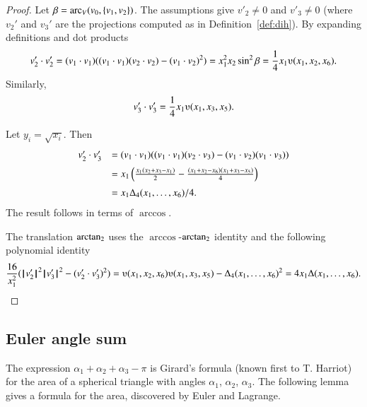 \begin{proof}
Let $\beta = \operatorname{arc}_V(v_0,\{v_1,v_2\})$.
The assumptions give $v'_2\ne 0$ and $v'_3 \ne 0$ (where $v_2'$ and
$v_3'$ are the projections computed as in Definition~\ref{def:dih}).  
    By expanding definitions and dot products
    $$
    v'_2\cdot v'_2 = (v_1\cdot v_1) ((v_1\cdot v_1)(v_2\cdot v_2) -
    (v_1\cdot v_2)^2) =  x_1^2 x_2 \sin^2 \beta = \frac{1}{4}
    x_1
    \ups(x_1,x_2,x_6).
    $$
    Similarly,
    $$v'_3 \cdot v'_3 = \frac{1}{4} x_1 \ups(x_1,x_3,x_5).$$

Let $y_i = \sqrt{x_i}$. Then
    $$\begin{array}{lll}
    v'_2\cdot v'_3 &= (v_1\cdot v_1)((v_1\cdot v_1)(v_2\cdot v_3) -
    (v_1\cdot v_2)(v_1\cdot v_3) ) \vspace{6pt} \\  &
    = x_1 \left(\frac{ x_1 (x_2 + x_3 -
    x_1)}{2} - \frac{(x_1 + x_2 - x_6)(x_1 + x_3 -
    x_5)}{4} \right)\vspace{6pt}\\&
    = {x_1\Delta_4(x_1,\ldots,x_6)}/{4}.
    \end{array}
    $$
The result follows in terms of $\arccos$.

The translation ${\operatorname{arctan_2}}$ uses the $\arccos$-${\operatorname{arctan_2}}$ identity
and the following polynomial identity
    $$
    \frac{16}{x_1^2}(\normo{v'_2}^2 \normo{v'_3}^2 - (v'_2\cdot v'_3)^2) =
    \ups(x_1,x_2,x_6)\ups(x_1,x_3,x_5) - \Delta_4(x_1,\ldots,x_6)^2
    = 4 x_1 \Delta(x_1,\ldots,x_6).
    $$
\end{proof}






\subsection{Euler angle sum}

The expression $\alpha_1+\alpha_2+\alpha_3-\pi$ is Girard's
formula (known first to T. Harriot) 
for the area of a spherical triangle with angles
$\alpha_1$, $\alpha_2$, $\alpha_3$.  The following lemma
gives a formula for the area, discovered by
Euler and Lagrange.

